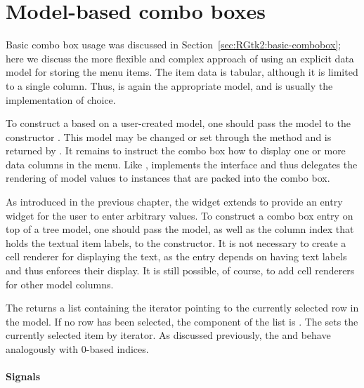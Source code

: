 
\section{Model-based combo boxes}
\label{sec:RGtk2:mvc:combobox}

Basic combo box usage was discussed in
Section~\ref{sec:RGtk2:basic-combobox}; here we discuss the more
flexible and complex approach of using an explicit data model for
storing the menu items. The item data is tabular, although it is
limited to a single column. Thus,  is again the
appropriate model, and  is usually the
implementation of choice.

To construct a  based on a user-created model, one
should pass the model to the constructor
. This model may be changed or set through
the  method and is returned by
. It remains to instruct the combo box
how to display one or more data columns in the menu. Like
,  implements the
 interface and thus delegates the rendering of
model values to  instances that are packed into
the combo box.

As introduced in the previous chapter, the 
widget extends  to provide an entry widget for the
user to enter arbitrary values. To construct a combo box entry on top
of a tree model, one should pass the model, as well as the column
index that holds the textual item labels, to the
 constructor. It is not necessary to
create a cell renderer for displaying the text, as the entry depends
on having text labels and thus enforces their display. It is still
possible, of course, to add cell renderers for other model columns.

The  returns a list containing the iterator
pointing to the currently selected row in the model.  If no row has been
selected, the  component of the list is .
The  sets the currently selected
item by iterator. As discussed previously, the
 and 
behave analogously with $0$-based indices.

\paragraph{Signals}

